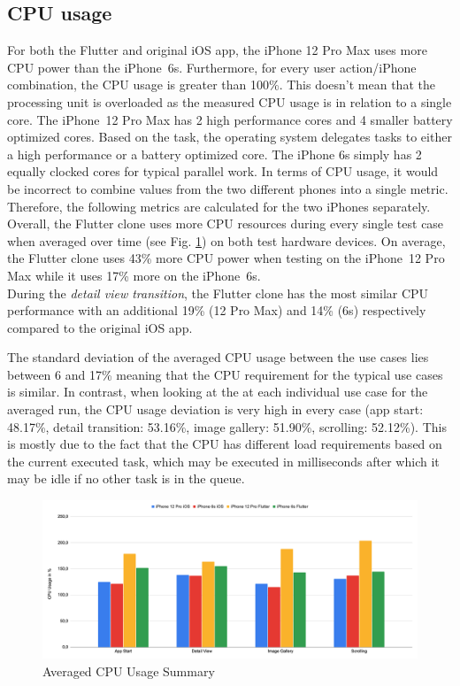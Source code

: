 \subsection{CPU usage} \label{section::cpu_usage}
For both the Flutter and original iOS app, the iPhone 12 Pro Max uses more CPU power than the iPhone~6s. Furthermore, for every user action/iPhone combination, the 
CPU usage is greater than 100\%. This doesn't mean that the processing unit is overloaded as the measured CPU usage is in relation to a single core.
The iPhone~12 Pro Max has 2 high performance cores and 4 smaller battery optimized cores. Based on the task, the operating system delegates tasks to either a high performance or a 
battery optimized core.
The iPhone 6s simply has 2 equally clocked cores for typical parallel work.
In terms of CPU usage, it would be incorrect to combine values from the two different phones into a single metric. Therefore, the following metrics are calculated for the two iPhones separately.\\
Overall, the Flutter clone uses more CPU resources during every single test case when averaged over time (see Fig. \ref{fig:avg_cpu_usage_summary}) on both test hardware devices.
On average, the Flutter clone uses 43\% more CPU power when testing on the iPhone~12 Pro Max while it uses 17\% more on the iPhone~6s.\\
During the \textit{detail view transition}, the Flutter clone has the most similar CPU performance with an additional 19\% (12 Pro Max) and 14\% (6s) respectively compared to the original iOS app.

The standard deviation of the averaged CPU usage between the use cases lies between 6 and 17\% meaning that the CPU requirement for the typical use cases is similar.
In contrast, when looking at the at each individual use case for the averaged run, the CPU usage deviation is very high in every case (app start: 48.17\%, detail transition: 53.16\%, image gallery: 51.90\%, scrolling: 52.12\%).
This is mostly due to the fact that the CPU has different load requirements based on the current executed task, which may be executed in milliseconds after which it may be idle if no other task is in the queue.

\begin{figure}[!h]
    \centering
    \includegraphics[width=\linewidth]{images/performance_results/summary_charts/avg_cpu_usage_summary.png}
    \caption{Averaged CPU Usage Summary}
    \label{fig:avg_cpu_usage_summary}
\end{figure}

